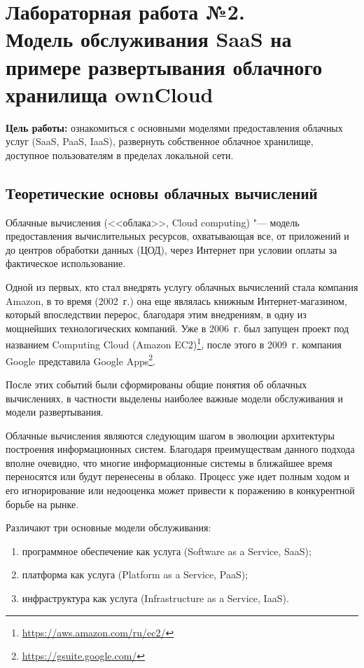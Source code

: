 \section[ЛР №2. Модель обслуживания SaaS, ownCloud]{Лабораторная работа №2. \\
Модель обслуживания SaaS на примере развертывания облачного хранилища ownCloud}

\textbf{Цель работы:} ознакомиться с основными моделями предоставления облачных услуг (SaaS, PaaS, IaaS), развернуть собственное облачное хранилище, доступное пользователям в пределах локальной сети.

\subsection{Теоретические основы облачных вычислений}

Облачные вычисления (<<облака>>, Cloud computing) "--- модель предоставления вычислительных ресурсов, охватывающая все, от приложений и до центров обработки данных (ЦОД), через Интернет при условии оплаты за фактическое использование.

Одной из первых, кто стал внедрять услугу облачных вычислений стала компания Amazon, в то время (2002~г.) она еще являлась книжным Интернет-магазином, который впоследствии перерос, благодаря этим внедрениям, в одну из мощнейших технологических компаний.
Уже в 2006~г. был запущен проект под названием Computing Cloud (Amazon EC2)\footnote{\url{https://aws.amazon.com/ru/ec2/}}, после этого в 2009~г. компания Google представила Google Apps\footnote{\url{https://gsuite.google.com/}}.

После этих событий были сформированы общие понятия об облачных вычислениях, в частности выделены наиболее важные модели обслуживания и модели развертывания.

Облачные вычисления являются следующим шагом в эволюции архитектуры построения информационных систем.
Благодаря преимуществам данного подхода вполне очевидно, что многие информационные системы в ближайшее время переносятся или будут перенесены в облако.
Процесс уже идет полным ходом и его игнорирование или недооценка может привести к поражению в конкурентной борьбе на рынке.

Различают три основные модели обслуживания:
\begin{enumerate}
    \item программное обеспечение как услуга (Software as a Service, SaaS);
    \item платформа как услуга (Platform as a Service, PaaS);
    \item инфраструктура как услуга (Infrastructure as a Service, IaaS).
\end{enumerate}

